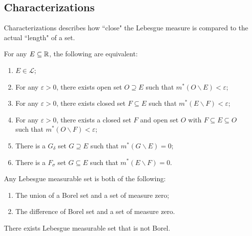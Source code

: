 \documentclass[class=book, crop=false]{standalone}
\begin{document}
    \subsection{Characterizations}
    Characterizations describes how ``close" the Lebesgue measure is compared to the actual ``length" of a set.
    \begin{theorem}
        For any $E \subseteq \mathbb{R}$, the following are equivalent:
        \begin{enumerate}
            \item $E \in \mathscr{L}$;
            \item For any $\varepsilon > 0$, there exists open set $O \supseteq E$ such that $m^*(O \backslash E) < \varepsilon$;
            \item For any $\varepsilon > 0$, there exists closed set $F \subseteq E$ such that $m^*(E \backslash F) < \varepsilon$;
            \item For any $\varepsilon > 0$, there exists a closed set $F$ and open set $O$ with $F \subseteq E \subseteq O$ such that $m^*(O \backslash F) < \varepsilon$;
            \item There is a $G_{\delta}$ set $G \supseteq E$ such that $m^*(G \backslash E) = 0$;
            \item There is a $F_{\sigma}$ set $G \subseteq E$ such that $m^*(E \backslash F) = 0$.
        \end{enumerate}
    \end{theorem}

    \begin{corollary}
        Any Lebesgue measurable set is both of the following:
        \begin{enumerate}
            \item The union of a Borel set and a set of measure zero;
            \item The difference of  Borel set and a set of measure zero.
        \end{enumerate}
    \end{corollary}
    \begin{remark}
        There exists Lebesgue measurable set that is not Borel.
    \end{remark}
\end{document}
